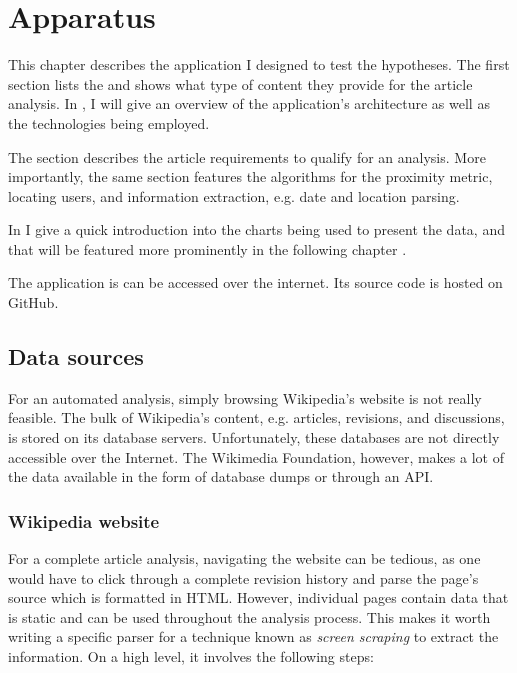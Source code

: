 \chapter{Apparatus}\label{ch:apparatus}

This chapter describes the application I designed to test the hypotheses.
The first section lists the  and shows what type of content they provide for the article analysis.
In , I will give an overview of the application's architecture as well as the technologies being employed.

The section  describes the article requirements to qualify for an analysis. 
More importantly, the same section features the algorithms for the proximity metric, locating users, and information extraction, e.g. date and location parsing.

In  I give a quick introduction into the charts being used to present the data, and that will be featured more prominently in the following chapter . 

The application is can be accessed over the internet.
Its source code is hosted on GitHub.

\section{Data sources}\label{sec:datasources}

For an automated analysis, simply browsing Wikipedia's website is not really feasible. 
The bulk of Wikipedia's content, e.g. articles, revisions, and discussions, is stored on its database servers.
Unfortunately, these databases are not directly accessible over the Internet.
The Wikimedia Foundation, however, makes a lot of the data available in the form of database dumps or through an \ac{API}.

\subsection{Wikipedia website}\label{sub:wpwebsite}

For a complete article analysis, navigating the website can be tedious, as one would have to click through a complete revision history and parse the page's source which is formatted in \ac{HTML}.
However, individual pages contain data that is static and can be used throughout the analysis process.
This makes it worth writing a specific parser for a technique known as \emph{screen scraping} to extract the information.
On a high level, it involves the following steps:

